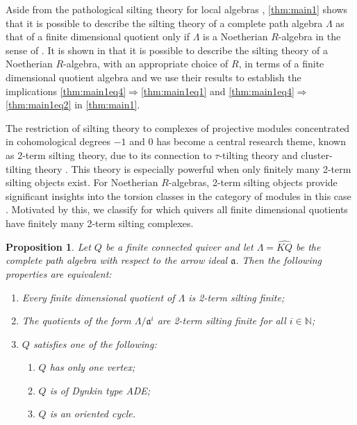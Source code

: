 \documentclass[11pt]{amsart}
\newcommand{\N}{\mathbb{N}}
\newcommand{\mfrak}{\mathfrak{a}}
\newtheorem{proposition}[theorem]{Proposition}
\theoremstyle{definition}
\begin{document}
Aside from the pathological silting theory for local algebras \cite[Thm. 2.26]{Aihara_2012}, \cref{thm:main1} shows that it is possible to describe the silting theory of a complete path algebra $\Lambda$ as that of a finite dimensional quotient only if $\Lambda$ is a Noetherian $R$-algebra in the sense of \cite{Ausl1977}. It is shown in \cite{Gnedin2022, Kimura2024} that it is possible to describe the silting theory of a Noetherian $R$-algebra, with an appropriate choice of $R$, in terms of a finite dimensional quotient algebra and we use their results to establish the implications \eqref{thm:main1eq4}$\Rightarrow$\eqref{thm:main1eq1} and \eqref{thm:main1eq4}$\Rightarrow$\eqref{thm:main1eq2} in \cref{thm:main1}.  


The restriction of silting theory to complexes of projective modules concentrated in cohomological degrees $-1$ and $0$ has become a central research theme, known as 2-term silting theory, due to its connection to $\tau$-tilting theory \cite{tau, DerksenFei2015} and cluster-tilting theory \cite{BMRRT}.  This theory is especially powerful when only finitely many 2-term silting objects exist. For Noetherian $R$-algebras, 2-term silting objects provide significant insights into the torsion classes in the category of modules  in this case \cite[Thm. 4.10]{IyamaKimura2024}. Motivated by this, we classify for which quivers all finite dimensional quotients have finitely many 2-term silting complexes. 


\begin{proposition}\label{thm:main2}
    Let $Q$ be a finite connected quiver and let $\Lambda = \widehat{KQ}$ be the complete path algebra with respect to the arrow ideal $\mathfrak{a}$. Then the following properties are equivalent:
    \begin{enumerate}
    	\item Every finite dimensional quotient of $\Lambda$ is 2-term silting finite;
	\item The quotients of the form $\Lambda/\mfrak^i$ are 2-term silting finite for all $i \in \N$;
	\item $Q$ satisfies one of the following:
	\begin{enumerate}
       		\item$Q$ has only one vertex;
        		\item $Q$ is of Dynkin type ADE;
        		\item $Q$ is an oriented cycle.
        \end{enumerate}
    \end{enumerate}
\end{proposition}
\end{document}
